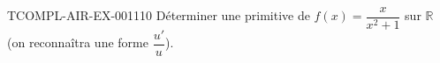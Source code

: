 \begin{exercice}{TCOMPL-AIR-EX-001}{1}{10}
Déterminer une primitive de $f(x) = \dfrac{x}{x^2+1}$ sur $\mathbb{R}$ (on reconnaîtra une forme $\dfrac{u'}{u}$).
\end{exercice}
